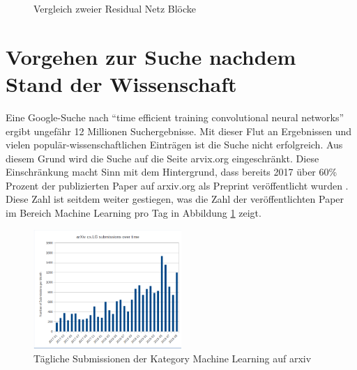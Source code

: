 \begin{figure}[h]
 \centering
 \qquad
       \caption{Vergleich zweier Residual Netz Blöcke \cite{resnet}}
\end{figure}


\section{Vorgehen zur Suche nachdem Stand der Wissenschaft}\label{sec:suche}
Eine Google-Suche nach ``time efficient training convolutional neural networks'' ergibt ungefähr 12 Millionen Suchergebnisse. Mit dieser Flut an Ergebnissen und vielen populär-wissenschaftlichen Einträgen ist die Suche nicht erfolgreich. Aus diesem Grund wird die Suche auf die Seite arvix.org eingeschränkt. Diese Einschränkung macht Sinn mit dem Hintergrund, dass bereits 2017 über 60\% Prozent der publizierten Paper auf arxiv.org als Preprint veröffentlicht wurden \cite{popular}. Diese Zahl ist seitdem weiter gestiegen, was die Zahl der veröffentlichten Paper im Bereich Machine Learning pro Tag in Abbildung \ref{abb:arxiv} zeigt.

\begin{figure}[h]
 \centering
 \includegraphics[width=0.5\textwidth]{KapitelPartA/images/arxiv.png}
 \caption{Tägliche Submissionen der Kategory Machine Learning auf arxiv \cite{cornell}}
 \label{abb:arxiv}
\end{figure}


